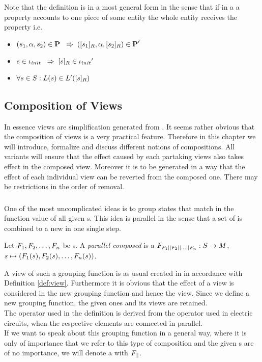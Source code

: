\documentclass[preview]{standalone}
\begin{document}
Note that the definition is in a most general form in the sense that if in a \viewN a property accounts to one piece of some entity the whole entity receives the property i.e. 
\begin{itemize}	
	\item $({s}_1, {\alpha}, {s}_2) \in {\ensuremath{{\textbf{P}}}} {\hspace{3mm}\Rightarrow\hspace{2mm}} ({{[{s}_1]_{{R}}}}, {\alpha}, {{[{s}_2]_{{R}}}}) \in {\ensuremath{{\textbf{P}}}}'$
	\item ${s} \in {\ensuremath{{\iota_{init}}}} {\hspace{3mm}\Rightarrow\hspace{2mm}} {\ensuremath{{[{s}]_{{R}}}}} \in {\iota_{init}}'$
	\item $\forall {s} \in {S} : {L}({s}) \in {L}'({{[{s}]_{{R}}}})$
\end{itemize}

\subsection{Composition of Views}
In essence views are simplification generated from \chosengraphtypeN. It seems rather obvious that the composition of views is a very practical feature. Therefore in this chapter we will introduce, formalize and discuss different notions of compositions. All variants will ensure that the effect caused by each partaking views also takes effect in the composed view. Moreover it is to be generated in a way that the effect of each individual view can be reverted from the composed one. There may be restrictions in the order of removal.

\subsubsection{\parllcompNCC}
One of the most uncomplicated ideas is to group states that match in the function value of all given \grpfctN s. This idea is parallel in the sense that a set of \grpfctN is combined to a new \grpfctN in one single step.
\begin{definition}
	Let ${F}_1, {F}_2, \dots, {F}_n$ be \grpfctN s. A \emph{parallel composed \grpfctN} is a \grpfctN ${F}_{{F}_1 {||} {F}_2 {||} \dots {||} {F}_n}: {S} \to {M}$, ${s} \mapsto ({F}_1({s}), {F}_2({s}), \dots, {F}_n({s}))$.
		
\end{definition}

A view of such a grouping function is as usual created in in accordance with Definition \ref{def:view}. Furthermore it is obvious that the effect of a view is considered in the new grouping function and hence the view.
Since we define a new grouping function, the given ones and its views are retained. \\
The operator \pll used in the definition is derived from the operator used in electric circuits, when the respective elements are connected in parallel. \\
If we want to speak about this grouping function in a general way, where it is only of importance that we refer to this type of composition and the given \grpfctN s are of no importance, we will denote a \emph{\parllcompN \grpfctN} with ${F}_{{||}}$. \\

\end{document}
